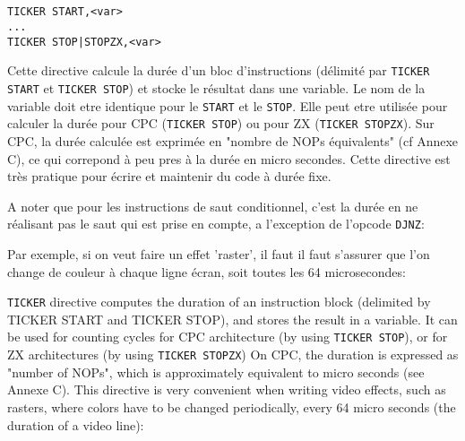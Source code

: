 \subsection{}


\subsection{}


\subsection{}



\begin{verbatim}
TICKER START,<var>
...
TICKER STOP|STOPZX,<var>
\end{verbatim}

\begin{xfr}
Cette directive calcule la durée d'un bloc d'instructions (délimité par \texttt{TICKER START} et \texttt{TICKER STOP})
et stocke le résultat dans une variable. Le nom de la variable doit etre identique pour le \texttt{START} et le \texttt{STOP}.
Elle peut etre utilisée pour calculer la durée pour CPC (\texttt{TICKER STOP}) ou pour ZX (\texttt{TICKER STOPZX}).
Sur CPC, la durée calculée est exprimée en "nombre de NOPs équivalents" (cf Annexe C), ce qui correpond à peu pres à la durée en micro secondes. Cette directive est très pratique pour écrire et maintenir du code à durée fixe.

A noter que pour les instructions de saut conditionnel, c'est la durée en ne réalisant pas le saut qui est prise en compte, a l'exception de l'opcode \texttt{DJNZ}:


Par exemple, si on veut faire un effet 'raster', il faut il faut s'assurer que l'on change de couleur à chaque ligne écran, soit toutes les 64 microsecondes:
\end{xfr}

\begin{xen}
\texttt{TICKER} directive computes the duration of an instruction block (delimited by TICKER START and TICKER STOP),
and stores the result in a variable.
It can be used for counting cycles for CPC architecture (by using \texttt{TICKER STOP}), or for ZX architectures (by using \texttt{TICKER STOPZX})
On CPC, the duration is expressed as "number of NOPs", which is approximately equivalent to micro seconds (see Annexe C).
This directive is very convenient when writing video effects, such as rasters, where colors have to be changed periodically, every 64 micro seconds (the duration of a video line):
\end{xen}


